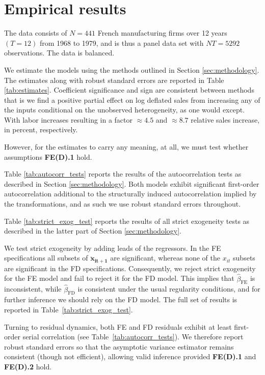 \section{Empirical results}

The data consists of $N = 441$ French manufacturing firms over 12 years $(T=12)$ from 1968 to 1979, and is thus a panel data set with $NT = 5292$ observations. The data is balanced.  

We estimate the models using the methods outlined in Section \ref{sec:methodology}. The estimates along with robust standard errors are reported in Table \ref{tab:estimates}. Coefficient significance and sign are consistent between methods that is we find a positive partial effect on log deflated sales from increasing any of the inputs conditional on the unobserved heterogeneity, as one would except. With labor increases resulting in a factor $\approx 4.5$ and $\approx 8.7$ relative sales increase, in percent, respectively. 



However, for the estimates to carry any meaning, at all, we must test whether assumptions \textbf{FE(D).1} hold. 

Table \ref{tab:autocorr_tests} reports the results of the autocorrelation tests as described in Section \ref{sec:methodology}. Both models exhibit significant first-order autocorrelation additional to the structurally induced autocorrelation implied by the transformations, and as such we use robust standard errors throughout.

Table \ref{tab:strict_exog_test} reports the results of all strict exogeneity tests as described in the latter part of Section \ref{sec:methodology}.



We test strict exogeneity by adding leads of the regressors. In the FE specifications all subsets of $\bm{\ddot{x}_{it+1}}$ are significant, whereas none of the $x_{it}$ subsets are significant in the FD specifications. Consequently, we reject strict exogeneity for the FE model and fail to reject it for the FD model. This implies that $\hat{\beta}_{\text{FE}}$ is inconsistent, while $\hat{\beta}_{\text{FD}}$ is consistent under the usual regularity conditions, and for further inference we should rely on the FD model. The full set of results is reported in Table~\ref{tab:strict_exog_test}. 



Turning to residual dynamics, both FE and FD residuals exhibit at least first-order serial correlation (see Table~\ref{tab:autocorr_tests}). We therefore report robust standard errors so that the asymptotic variance estimator remains consistent (though not efficient), allowing valid inference provided \textbf{FE(D).1} and \textbf{FE(D).2} hold.

